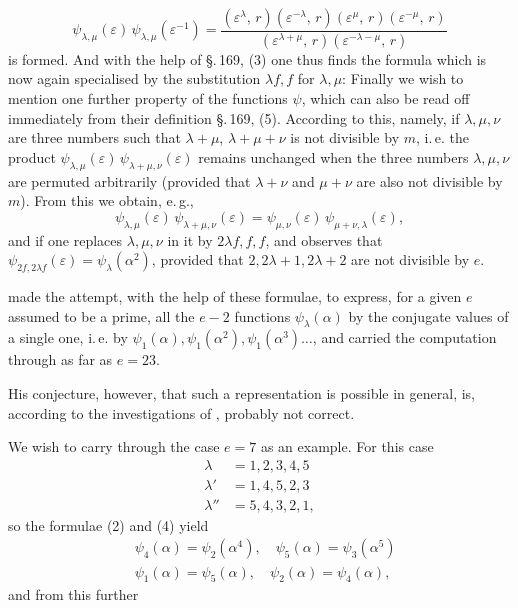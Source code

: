 
\[
\psi_{\lambda,\mu}(\varepsilon)\,\psi_{\lambda,\mu}(\varepsilon^{-1})
= \frac{(\varepsilon^\lambda,\,r)(\varepsilon^{-\lambda},\,r)(\varepsilon^\mu,\,r)(\varepsilon^{-\mu},\,r)}
       {(\varepsilon^{\lambda+\mu},\,r)(\varepsilon^{-\lambda-\mu},\,r)}
\]
is formed. And with the help of \S.\,169, (3) one thus finds the formula
which is now again specialised by the substitution $\lambda f, f$ for $\lambda, \mu$:
Finally we wish to mention one further property of the functions $\psi$, which can also be read off immediately from their definition \S.\,169, (5). According to this, namely, if $\lambda, \mu, \nu$ are three numbers such that $\lambda + \mu$, $\lambda + \mu + \nu$ is not divisible by $m$,
i.\,e. the product $\psi_{\lambda,\mu}(\varepsilon)\,\psi_{\lambda+\mu,\nu}(\varepsilon)$ remains unchanged when the three numbers $\lambda, \mu, \nu$ are permuted arbitrarily (provided that $\lambda + \nu$ and $\mu + \nu$ are also not divisible by $m$). From this we obtain, e.\,g.,
\[
\psi_{\lambda,\mu}(\varepsilon)\,\psi_{\lambda+\mu,\nu}(\varepsilon) = \psi_{\mu,\nu}(\varepsilon)\,\psi_{\mu+\nu,\lambda}(\varepsilon),
\]
and if one replaces $\lambda, \mu, \nu$ in it by $2\lambda f, f, f$, and observes that $\psi_{2f,2\lambda f}(\varepsilon) = \psi_\lambda(\alpha^2)$,
provided that $2, 2\lambda + 1, 2\lambda + 2$ are not divisible by $e$.

 made the attempt, with the help of these formulae, to express, for a given $e$ assumed to be a prime, all the $e - 2$ functions $\psi_\lambda(\alpha)$ by the conjugate values of a single one, i.\,e. by $\psi_1(\alpha), \psi_1(\alpha^2), \psi_1(\alpha^3) \ldots$, and carried the computation through as far as $e = 23$.

His conjecture, however, that such a representation is possible in general, is, according to the investigations of , probably not correct.

We wish to carry through the case $e = 7$ as an example. For this case
\[
\begin{aligned}
\lambda &= 1, 2, 3, 4, 5\\
\lambda' &= 1, 4, 5, 2, 3\\
\lambda'' &= 5, 4, 3, 2, 1,
\end{aligned}
\]
so the formulae (2) and (4) yield
\[
\begin{aligned}
&\psi_4(\alpha) = \psi_2(\alpha^4), \quad \psi_5(\alpha) = \psi_3(\alpha^5)\\
&\psi_1(\alpha) = \psi_5(\alpha), \quad \psi_2(\alpha) = \psi_4(\alpha),
\end{aligned}
\]
and from this further
